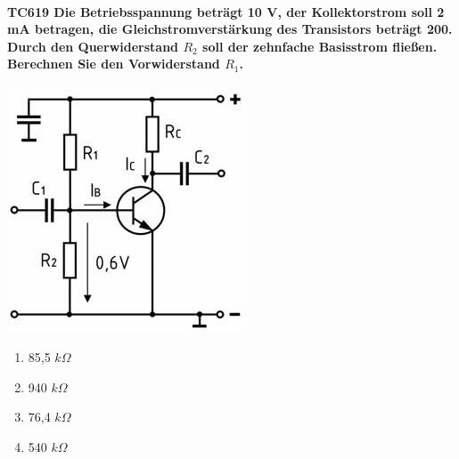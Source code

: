\documentclass[8pt]{article}
\begin{document}
\begin{enumerate}
\begin{enumerate}[nolistsep,label=\Alph*]
{\begin{enumerate}[nolistsep,label=\Alph*]
\paragraph*{TC619 Die Betriebsspannung beträgt 10 V, der Kollektorstrom soll 2 mA betragen, die Gleichstromverstärkung des Transistors beträgt 200. Durch den Querwiderstand $R_{2}$ soll der zehnfache Basisstrom fließen. Berechnen Sie den Vorwiderstand $R_{1}$.}
\begin{center}
	\begin{minipage}{\linewidth}
		\centering
		\includegraphics[scale=1.0]{pics/tc619_a.jpg}
	\end{minipage}
\end{center}
\begin{enumerate}[nolistsep,label=\Alph*]
\item 85,5 $k\Omega$
\item 940 $k\Omega$
\item 76,4 $k\Omega$
\item 540 $k\Omega$
\end{enumerate}


\end{enumerate}}
\end{enumerate}
\end{enumerate}
\end{document}

